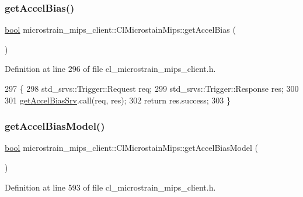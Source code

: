 \subsubsection{\texorpdfstring{get\+Accel\+Bias()}{getAccelBias()}}
{\footnotesize\ttfamily \hyperlink{classbool}{bool} microstrain\+\_\+mips\+\_\+client\+::\+Cl\+Microstain\+Mips\+::get\+Accel\+Bias (\begin{DoxyParamCaption}{ }\end{DoxyParamCaption})\hspace{0.3cm}{\ttfamily [inline]}}



Definition at line 296 of file cl\+\_\+microstrain\+\_\+mips\+\_\+client.\+h.


\begin{DoxyCode}
297     \{
298         std\_srvs::Trigger::Request req;
299         std\_srvs::Trigger::Response res;
300 
301         \hyperlink{classmicrostrain__mips__client_1_1ClMicrostainMips_a79b54cbc814629504707f2382d250bec}{getAccelBiasSrv}.call(req, res);
302         \textcolor{keywordflow}{return} res.success;
303     \}
\end{DoxyCode}
\mbox{\label{classmicrostrain__mips__client_1_1ClMicrostainMips_aa188b6a45598bc3f86fd89fbe6a69091}} 
\subsubsection{\texorpdfstring{get\+Accel\+Bias\+Model()}{getAccelBiasModel()}}
{\footnotesize\ttfamily \hyperlink{classbool}{bool} microstrain\+\_\+mips\+\_\+client\+::\+Cl\+Microstain\+Mips\+::get\+Accel\+Bias\+Model (\begin{DoxyParamCaption}{ }\end{DoxyParamCaption})\hspace{0.3cm}{\ttfamily [inline]}}



Definition at line 593 of file cl\+\_\+microstrain\+\_\+mips\+\_\+client.\+h.


